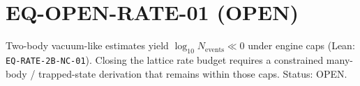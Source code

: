 \documentclass{article}
\begin{document}
\section*{EQ-OPEN-RATE-01 (OPEN)}
Two-body vacuum-like estimates yield $\log_{10} N_{\mathrm{events}} \ll 0$ under
engine caps (Lean: \texttt{EQ-RATE-2B-NC-01}). Closing the lattice rate budget
requires a constrained many-body / trapped-state derivation that remains within
those caps. Status: OPEN.
\end{document}
